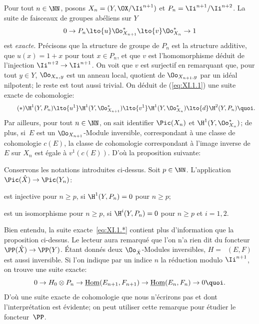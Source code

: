 Pour tout $n\in\NN$, posons $X_n = (Y, \OX/\Ii^{n+1})$ et $P_n = \Ii^{n+1}/\Ii^{n+2}$. La suite de faisceaux de groupes ab\'eliens sur $Y$
\begin{equation} \label{eq:XI.1.1} 0\to P_n\lto{u}\Oo_{X_{n+1}}^*\lto{v}\Oo_{X_n}^*\to 1
\end{equation}
est \emph{exacte}. Pr\'ecisons que la structure de groupe de $P_n$ est la structure additive, que $u(x)=1+x$ pour tout $x\in P_n$, et que $v$ est l'homomorphisme d\'eduit de l'injection $\Ii^{n+2}\to\Ii^{n+1}$. On voit que $v$ est surjectif en remarquant que, pour tout $y \in Y$, $\Oo_{X_n, y}$ est un anneau local, quotient de $\Oo_{X_{n+1}, y}$ par un id\'eal nilpotent; le reste est tout aussi trivial. On d\'eduit de (\ref{eq:XI.1.1}) une suite exacte de cohomologie:
\begin{equation*} \label{eq:XI.1.*} \tag{$*$}
\H^1(Y, P_n)\lto{u^1}\H^1(Y, \Oo_{X_{n+1}}^*)\lto{v^1} \H^1(Y, \Oo_{X_n}^*)\lto{d}\H^2(Y, P_n){\quoi}.
\end{equation*}
Par ailleurs, pour tout $n\in\NN$, on sait identifier $\Pic(X_n)$ et $\H^1(Y, \Oo_{X_n}^*)$; de plus, si~$E$ est un $\Oo_{X_{n+1}}$-Module inversible, correspondant \`a une classe de cohomologie $c(E)$, la classe de cohomologie correspondant \`a l'image inverse de $E$ sur $X_n$ est \'egale \`a $v^1(c(E))$. D'o\`u la proposition suivante:

\begin{proposition} \label{XI.1.1} Conservons les notations introduites ci-dessus. Soit $p\in\NN$. L'application $\Pic(\hat X)\to \Pic(Y_n)$:
\begin{enumeratei}
\item
est injective pour $n\geq p$, si $\H^1(Y, P_n)=0$ pour $n\geq p$;
\item
est un isomorphisme pour $n\geq p$, si $\H^i(Y, P_n)=0$ pour $n\geq p$ et $i=1, 2$.
\end{enumeratei}
\end{proposition}

Bien entendu, la suite exacte~\eqref{eq:XI.1.*} contient plus d'information que la proposition ci-dessus. Le lecteur aura remarqu\'e que l'on n'a rien dit du foncteur $\PP(\hat X)\to\PP(Y)$. \'Etant donn\'es deux $\Oo_{\hat X}$-Modules inversibles, $H=\mathop{\underline{\mathrm{Hom}}}\nolimits(E, F)$ est aussi inversible. Si l'on indique par un indice $n$ la r\'eduction modulo $\Ii^{n+1}$, on trouve une suite exacte:
\[
0\to H_0\otimes P_n \to \mathop{\underline{\mathrm{Hom}}}\nolimits(E_{n+1}, F_{n+1}) \to \mathop{\underline{\mathrm{Hom}}}\nolimits(E_n, F_n)\to 0{\quoi}.
\]
D'o\`u une suite exacte de cohomologie que nous n'\'ecrirons pas et dont l'interpr\'etation est \'evidente; on peut utiliser cette remarque pour \'etudier le foncteur~$\PP$.

